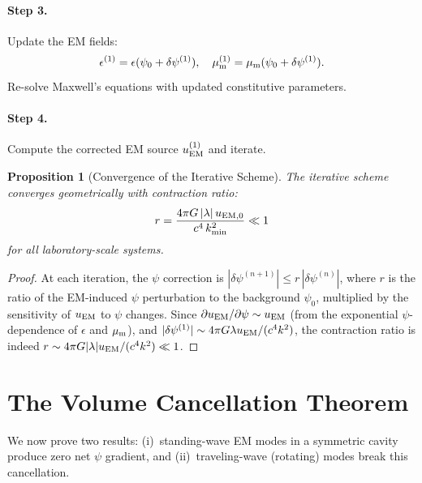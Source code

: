 \documentclass[aps,prd,twocolumn,superscriptaddress,floatfix,nofootinbib]{revtex4-2}
\newcommand{\lam}{\lambda}
\newtheorem{proposition}[theorem]{Proposition}
\begin{document}
\paragraph{Step 3.} Update the EM fields:
\begin{equation}
\epsilon^{(1)} = \epsilon(\psi_0 + \delta\psi^{(1)}), \quad
\mu_{\rm m}^{(1)} = \mu_{\rm m}(\psi_0 + \delta\psi^{(1)}).
\end{equation}
Re-solve Maxwell's equations with updated constitutive parameters.

\paragraph{Step 4.} Compute the corrected EM source
$u_{\rm EM}^{(1)}$ and iterate.

\begin{proposition}[Convergence of the Iterative Scheme]
The iterative scheme converges geometrically with contraction ratio:
\begin{equation}
r = \frac{4\pi G\,|\lam|\,u_{\rm EM,0}}{c^4\,k_{\rm min}^2} \ll 1
\end{equation}
for all laboratory-scale systems.
\end{proposition}

\begin{proof}
At each iteration, the $\psi$ correction is
$|\delta\psi^{(n+1)}| \leq r\,|\delta\psi^{(n)}|$, where $r$
is the ratio of the EM-induced $\psi$ perturbation to the
background $\psi_0$, multiplied by the sensitivity of $u_{\rm EM}$
to $\psi$ changes. Since $\partial u_{\rm EM}/\partial\psi \sim
u_{\rm EM}$ (from the exponential $\psi$-dependence of $\epsilon$
and $\mu_{\rm m}$), and $|\delta\psi^{(1)}| \sim
4\pi G\lam u_{\rm EM}/(c^4 k^2)$, the contraction ratio is
indeed $r \sim 4\pi G|\lam| u_{\rm EM}/(c^4 k^2) \ll 1$.
\end{proof}


\section{The Volume Cancellation Theorem}\label{sec:cancellation}

We now prove two results: (i)~standing-wave EM modes in a symmetric
cavity produce zero net $\psi$ gradient, and (ii)~traveling-wave
(rotating) modes break this cancellation.
\end{document}
